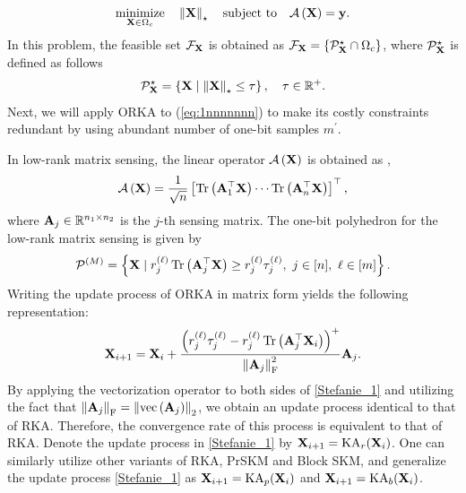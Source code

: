 \documentclass[12pt,draftcls,onecolumn]{IEEEtran}
\begin{document}
\begin{equation}
\label{eq:1nnnnnnn}
\begin{aligned}
\underset{\mbX \in \Omega_{c}}{\textrm{minimize}}\quad \left\|\mbX\right\|_{\star}\quad
\text{subject to} \quad \mathcal{A}\left(\mbX\right)=\mathbf{y}.
\end{aligned}
\end{equation}
In this problem, the feasible set $\mathcal{F}_{\mathbf{X}}$ is obtained as
$\mathcal{F}_{\mathbf{X}}=\left\{\mathcal{P}^{\star}_{\mathbf{X}}\cap \Omega_{c}\right\}$,
where $\mathcal{P}^{\star}_{\mathbf{X}}$ is defined as follows
\begin{equation}
\label{stephanie}
\mathcal{P}^{\star}_{\mbX} = \left\{\mbX \mid
\left\|\mbX\right\|_{\star}\leq \tau\right\},\quad
\tau\in\mathbb{R}^{+}.
\end{equation}\normalsize
Next, we will apply ORKA to (\ref{eq:1nnnnnnn}) to make its costly constraints redundant by using abundant number of one-bit samples $m^{\prime}$.

In low-rank matrix sensing, the linear operator $\mathcal{A}\left(\mathbf{X}\right)$ is obtained as \cite{chi2019nonconvex},
\begin{equation}
\label{Stefanie_2}
\mathcal{A}\left(\mbX\right)=\frac{1}{\sqrt{n}}\left[\operatorname{Tr}\left(\mbA^{\top}_1\mbX\right)\cdots\operatorname{Tr}\left(\mbA^{\top}_n\mbX\right)\right]^{\top},
\end{equation}
where $\mathbf{A}_j\in\mathbb{R}^{n_1\times n_2}$ is the $j$-th sensing matrix. The one-bit polyhedron for the low-rank matrix sensing is given by
\begin{equation}
\label{kumar}
\mathcal{P}^{(M)}=\left\{\mbX \mid r^{(\ell)}_{j}\operatorname{Tr}\left(\mbA^{\top}_j\mbX\right)\geq r^{(\ell)}_{j}\tau^{(\ell)}_{j},~j\in[n],~\ell\in[m]\right\}.  
\end{equation}
Writing the update process of ORKA in matrix form yields the following representation:
\begin{equation}
\label{Stefanie_1}   
\mbX_{i+1} =\mbX_i+\frac{\left(r^{(\ell)}_j\tau^{(\ell)}_j-r^{(\ell)}_j\operatorname{Tr}\left(\mbA^{\top}_j\mbX_i\right) \right)^{+}}{\left\|\mbA_{j}\right\|^{2}_{\mathrm{F}}} \mbA_{j}.
\end{equation}
By applying the vectorization operator to both sides of \eqref{Stefanie_1} and utilizing the fact that $\left\|\mathbf{A}_j\right\|_{\mathrm{F}}=\left\|\operatorname{vec}\left(\mathbf{A}_j\right)\right\|_2$, we obtain an update process identical to that of RKA. Therefore, the convergence rate of this process is equivalent to that of RKA. Denote the update process in \eqref{Stefanie_1} by $\mathbf{X}_{i+1}=\mathrm{KA}_{r}(\mathbf{X}_i)$.
One can similarly utilize other variants of RKA, PrSKM and Block SKM, and generalize the update process \eqref{Stefanie_1} as $\mathbf{X}_{i+1}=\mathrm{KA}_{p}(\mathbf{X}_i)$ and $\mathbf{X}_{i+1}=\mathrm{KA}_{b}(\mathbf{X}_i)$.
\end{document}
